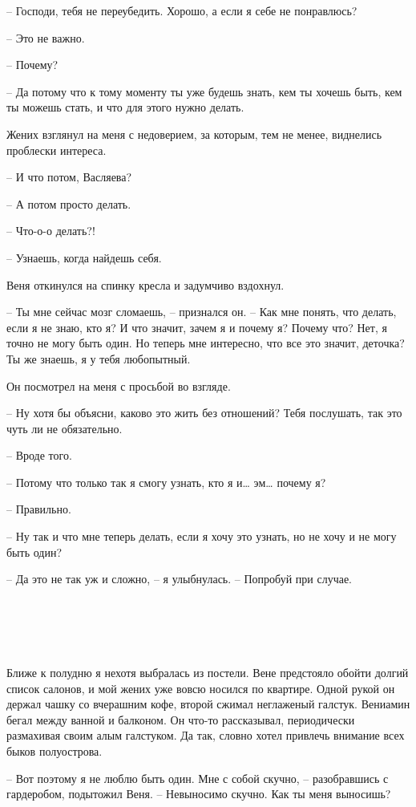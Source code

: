 \documentclass[
]{book}
\begin{document}
-- Господи, тебя не переубедить. Хорошо, а если я себе не понравлюсь?

-- Это не важно.

-- Почему?

-- Да потому что к тому моменту ты уже будешь знать, кем ты хочешь быть, кем ты можешь стать, и что для этого нужно делать.

Жених взглянул на меня с недоверием, за которым, тем не менее, виднелись проблески интереса.

-- И что потом, Васляева?

-- А потом просто делать.

-- Что-о-о делать?!

-- Узнаешь, когда найдешь себя.

Веня откинулся на спинку кресла и задумчиво вздохнул.

-- Ты мне сейчас мозг сломаешь, -- признался он. -- Как мне понять, что делать, если я не знаю, кто я? И что значит, зачем я и почему я? Почему что? Нет, я точно не могу быть один. Но теперь мне интересно, что все это значит, деточка? Ты же знаешь, я у тебя любопытный.

Он посмотрел на меня с просьбой во взгляде.

-- Ну хотя бы объясни, каково это жить без отношений? Тебя послушать, так это чуть ли не обязательно.

-- Вроде того.

-- Потому что только так я смогу узнать, кто я и\ldots{} эм\ldots{} почему я?

-- Правильно.

-- Ну так и что мне теперь делать, если я хочу это узнать, но не хочу и не могу быть один?

-- Да это не так уж и сложно, -- я улыбнулась. -- Попробуй при случае.

\hypertarget{chapter-16}{%
\chapter{~}\label{chapter-16}}

Ближе к полудню я нехотя выбралась из постели. Вене предстояло обойти долгий список салонов, и мой жених уже вовсю носился по квартире. Одной рукой он держал чашку со вчерашним кофе, второй сжимал неглаженый галстук. Вениамин бегал между ванной и балконом. Он что-то рассказывал, периодически размахивая своим алым галстуком. Да так, словно хотел привлечь внимание всех быков полуострова.

-- Вот поэтому я не люблю быть один. Мне с собой скучно, -- разобравшись с гардеробом, подытожил Веня. -- Невыносимо скучно. Как ты меня выносишь?
\end{document}
